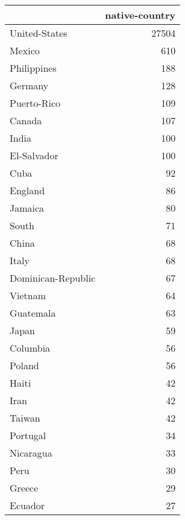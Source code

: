 \begin{tabular}{lr}
\toprule
{} &  native-country \\
\midrule
 United-States              &           27504 \\
 Mexico                     &             610 \\
 Philippines                &             188 \\
 Germany                    &             128 \\
 Puerto-Rico                &             109 \\
 Canada                     &             107 \\
 India                      &             100 \\
 El-Salvador                &             100 \\
 Cuba                       &              92 \\
 England                    &              86 \\
 Jamaica                    &              80 \\
 South                      &              71 \\
 China                      &              68 \\
 Italy                      &              68 \\
 Dominican-Republic         &              67 \\
 Vietnam                    &              64 \\
 Guatemala                  &              63 \\
 Japan                      &              59 \\
 Columbia                   &              56 \\
 Poland                     &              56 \\
 Haiti                      &              42 \\
 Iran                       &              42 \\
 Taiwan                     &              42 \\
 Portugal                   &              34 \\
 Nicaragua                  &              33 \\
 Peru                       &              30 \\
 Greece                     &              29 \\
 Ecuador                    &              27 \\

\end{tabular}
